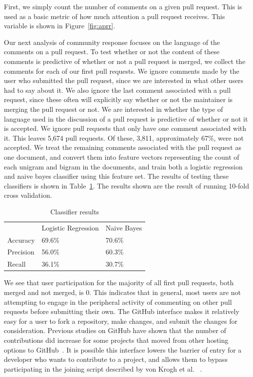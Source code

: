 \documentclass{iitthesis}
\begin{document}
First, we simply count the number of comments on a given pull request. This is
used as a basic metric of how much attention a pull request receives. This
variable is shown in Figure~\ref{fig:aprr}.

Our next analysis of community response focuses on the language of the comments
on a pull request. To test whether or not the content of these comments is
predictive of whether or not a pull request is merged, we collect the comments
for each of our first pull requests. We ignore comments made by the user who
submitted the pull request, since we are interested in what other users had to
say about it. We also ignore the last comment associated with a pull request,
since these often will explicitly say whether or not the maintainer is merging
the pull request or not.  We are interested in whether the type of language used
in the discussion of a pull request is predictive of whether or not it is
accepted. We ignore pull requests that only have one comment associated with it.
This leaves 5,674 pull requests. Of these, 3,811, approximately 67\%, were not
accepted. We treat the remaining comments associated with the pull request as
one document, and convert them into feature vectors representing the count of
each unigram and bigram in the documents, and train both a logistic regression
and naive bayes classifier using this feature set. The results of testing these
classifiers is shown in Table~\ref{tbl:classifiers}. The results shown are the
result of running 10-fold cross validation.

\begin{table}[ht] \centering
  \caption{Classifier results}
  \label{tbl:classifiers}
  \begin{tabular}{lll}
  \hline\hline
  ~         & Logistic Regression & Naive Bayes \\
  Accuracy  & 69.6\%              & 70.6\%      \\
  Precision & 56.0\%              & 60.3\%      \\
  Recall    & 36.1\%              & 30.7\%      \\
  \hline
  \end{tabular}
\end{table}

 \label{chap:results}

 \label{results_engagement}

We see that user participation for the majority of all first pull requests, both
merged and not merged, is 0. This indicates that in general, most users are not
attempting to engage in the peripheral activity of commenting on other pull
requests before submitting their own. The GitHub interface makes it relatively
easy for a user to fork a repository, make changes, and submit the changes for
consideration. Previous studies on GitHub have shown that the number of
contributions did increase for some projects that moved from other hosting
options to GitHub~\cite{mcdonald_performance_2013}. It is possible this
interface lowers the barrier of entry for a developer who wants to contribute to
a project, and allows them to bypass participating in the joining script
described by von Krogh et al. ~\cite{von_krogh_community_2003}.
\end{document}
